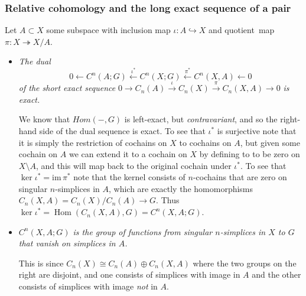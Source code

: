 \documentclass[10pt]{article}
\newcommand{\im}{\mathrm{im}\,}
\DeclareMathOperator{\Hom}{Hom}
\begin{document}
            \subsubsection{Relative cohomology and the long exact sequence of a pair}

                Let $A\subset X$ some subspace with inclusion map $\iota\colon A\hookrightarrow X$ and \mbox{quotient map $\pi\colon X\twoheadrightarrow X/A$}.

                \begin{itemize}
                    \item \emph{The dual}
                        \begin{equation*}
                            0\leftarrow C^n(A;G)\xleftarrow{\iota^*}C^n(X;G)\xleftarrow{\pi^*}C^n(X,A)\leftarrow0
                        \end{equation*}
                        \emph{of the short exact sequence} $0\to C_n(A)\xrightarrow{\iota}C_n(X)\xrightarrow{\pi}C_n(X,A)\to0$ \emph{is exact.}

                        We know that $Hom(-,G)$ is left-exact, but \emph{contravariant}, and so the right-hand side of the dual sequence is exact.
                        To see that $\iota^*$ is surjective note that it is simply the restriction of cochains on $X$ to cochains on $A$, but given some cochain on $A$ we can extend it to a cochain on $X$ by defining to to be zero on $X\setminus A$, and this will map back to the original cochain under $\iota^*$.
                        To see that $\ker\iota^*=\im\pi^*$ note that the kernel consists of $n$-cochains that are zero on singular $n$-simplices in $A$, which are exactly the homomorphisms $C_n(X,A)=C_n(X)/C_n(A)\to G$.
                        Thus $\ker\iota^*=\Hom(C_n(X,A),G)=C^n(X,A;G)$.

                    \item \emph{$C^n(X,A;G)$ is the group of functions from singular $n$-simplices in $X$ to $G$ that vanish on simplices in $A$.}

                        This is since $C_n(X)\cong C_n(A)\oplus C_n(X,A)$ where the two groups on the right are disjoint, and one consists of simplices with image in $A$ and the other consists of simplices with image \emph{not} in $A$.


\end{itemize}
\end{document}
